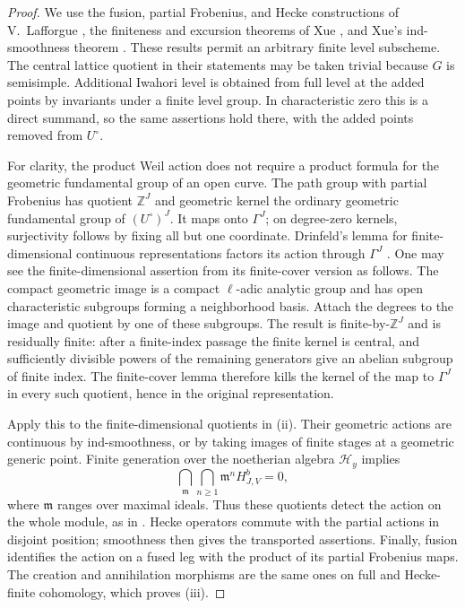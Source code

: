 \documentclass[11pt]{article}
\numberwithin{equation}{section}
\theoremstyle{definition}
\theoremstyle{remark}
\newcommand{\Z}{\mathbb Z}
\begin{document}
\begin{proof}
We use the fusion, partial Frobenius, and Hecke constructions of
V.~Lafforgue \cite[Propositions~4.12, 4.14, and~6.2]{Hist:VLafforgue}, the finiteness and excursion
theorems of Xue
\cite[Theorem~2 and Sections~3.2--3.7]{Bounds:XueFiniteness}, and
Xue's ind-smoothness theorem
\cite[Theorem~4.2.3 and Proposition~5.0.4]{Bounds:XueSmoothness}.
These results permit an arbitrary finite level subscheme.  The central
lattice quotient in their statements may be taken trivial because $G$
is semisimple.  Additional Iwahori level is obtained from full level at
the added points by invariants under a finite level group.  In
characteristic zero this is a direct summand, so the same assertions
hold there, with the added points removed from $U^\circ$.

For clarity, the product Weil action does not require a product formula
for the geometric fundamental group of an open curve.  The path group
with partial Frobenius has quotient $\Z^J$ and geometric kernel the
ordinary geometric fundamental group of $(U^\circ)^J$.  It maps onto
$\Gamma^J$; on degree-zero kernels, surjectivity follows by fixing all
but one coordinate.  Drinfeld's lemma for finite-dimensional
continuous representations factors its action through $\Gamma^J$
\cite[Lemmas~3.2.10 and~3.3.2]{Bounds:XueFiniteness}.
One may see the finite-dimensional assertion from its finite-cover
version as follows.  The compact geometric image is a compact
$\ell$-adic analytic group and has open characteristic subgroups
forming a neighborhood basis.  Attach the degrees to the image and
quotient by one of these subgroups.  The result is finite-by-$\Z^J$
and is residually finite: after a finite-index passage the finite
kernel is central, and sufficiently divisible powers of the remaining
generators give an abelian subgroup of finite index.  The finite-cover
lemma therefore kills the kernel of the map to $\Gamma^J$ in every
such quotient, hence in the original representation.

Apply this to the finite-dimensional quotients in (ii).  Their
geometric actions are continuous by ind-smoothness, or by taking
images of finite stages at a geometric generic point.  Finite
generation over the noetherian algebra $\mathcal H_y$ implies
\[
 \bigcap_{\mathfrak m}\bigcap_{n\geq 1}
       \mathfrak m^n H^b_{J,V}=0,
\]
where $\mathfrak m$ ranges over maximal ideals.  Thus these quotients
detect the action on the whole module, as in
\cite[Lemma~3.2.13]{Bounds:XueFiniteness}.  Hecke operators commute
with the partial actions in disjoint position; smoothness then gives
the transported assertions.  Finally, fusion identifies the action on
a fused leg with the product of its partial Frobenius maps.  The
creation and annihilation morphisms are the same ones on full and
Hecke-finite cohomology, which proves (iii).
\end{proof}
\end{document}
